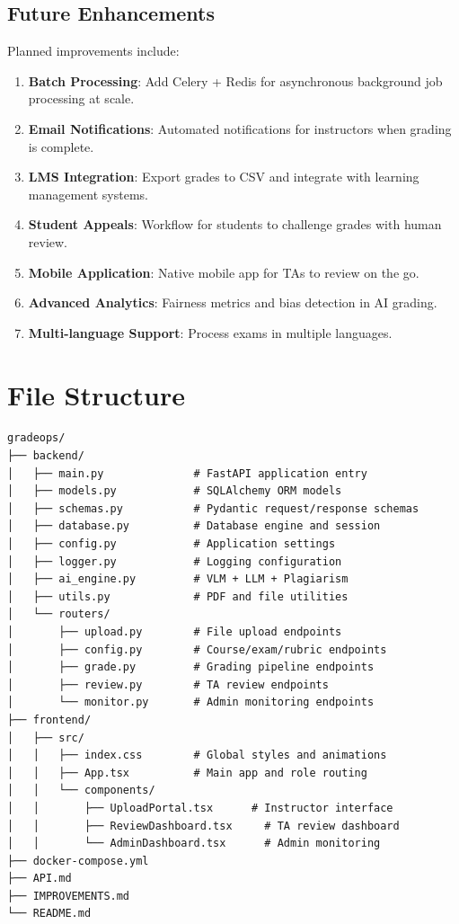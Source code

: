 \documentclass[11pt,a4paper]{article}
\begin{document}
\subsection{Future Enhancements}
Planned improvements include:

\begin{enumerate}[leftmargin=2em]
    \item \textbf{Batch Processing}: Add Celery + Redis for asynchronous background job processing at scale.
    \item \textbf{Email Notifications}: Automated notifications for instructors when grading is complete.
    \item \textbf{LMS Integration}: Export grades to CSV and integrate with learning management systems.
    \item \textbf{Student Appeals}: Workflow for students to challenge grades with human review.
    \item \textbf{Mobile Application}: Native mobile app for TAs to review on the go.
    \item \textbf{Advanced Analytics}: Fairness metrics and bias detection in AI grading.
    \item \textbf{Multi-language Support}: Process exams in multiple languages.
\end{enumerate}

\newpage
\appendix
\section{File Structure}

\begin{lstlisting}[caption={Project directory structure}]
gradeops/
├── backend/
│   ├── main.py              # FastAPI application entry
│   ├── models.py            # SQLAlchemy ORM models
│   ├── schemas.py           # Pydantic request/response schemas
│   ├── database.py          # Database engine and session
│   ├── config.py            # Application settings
│   ├── logger.py            # Logging configuration
│   ├── ai_engine.py         # VLM + LLM + Plagiarism
│   ├── utils.py             # PDF and file utilities
│   └── routers/
│       ├── upload.py        # File upload endpoints
│       ├── config.py        # Course/exam/rubric endpoints
│       ├── grade.py         # Grading pipeline endpoints
│       ├── review.py        # TA review endpoints
│       └── monitor.py       # Admin monitoring endpoints
├── frontend/
│   ├── src/
│   │   ├── index.css        # Global styles and animations
│   │   ├── App.tsx          # Main app and role routing
│   │   └── components/
│   │       ├── UploadPortal.tsx      # Instructor interface
│   │       ├── ReviewDashboard.tsx     # TA review dashboard
│   │       └── AdminDashboard.tsx      # Admin monitoring
├── docker-compose.yml
├── API.md
├── IMPROVEMENTS.md
└── README.md
\end{lstlisting}

\end{document}
